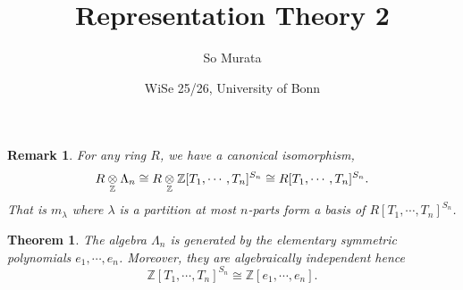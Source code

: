 \documentclass{article}
\title{Representation Theory 2}
\author{So Murata}
\date{WiSe 25/26, University of Bonn}
\newtheorem{theorem}{Theorem} [section]
\newtheorem{remark}{Remark}[section]
\numberwithin{equation}{theorem}
\newcommand{\Z}[0]{\mathbb{Z}}
\newcommand{\tens}[1]{%
  \mathbin{\mathop{\otimes}\displaylimits_{#1}}%
}
\begin{document}
\maketitle
\begin{remark}
    For any ring $R$, we have a canonical isomorphism,
    \begin{equation*}
        R\tens{\Z}\Lambda_n \cong R\tens{\Z}\Z[T_1,\cdots,T_n]^{S_n}\cong R[T_1,\cdots,T_n]^{S_n}.
    \end{equation*}
    That is $m_\lambda$ where $\lambda$ is a partition at most $n$-parts form a basis of $R[T_1,\cdots,T_n]^{S_n}$.
\end{remark}
\begin{theorem}
    The algebra $\Lambda_n$ is generated by the elementary symmetric polynomials $e_1,\cdots,e_n$. Moreover, they are algebraically independent hence 
    \begin{equation*}
        \Z[T_1,\cdots,T_n]^{S_n}\cong \Z[e_1,\cdots,e_n].
    \end{equation*}
\end{theorem}
\end{document}

